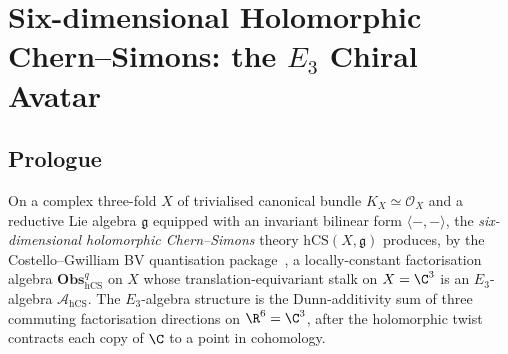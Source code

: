 
\providecommand{\SCchtop}{\mathsf{SC}^{\mathrm{ch},\mathrm{top}}}
\providecommand{\hCS}{\mathrm{hCS}}
\providecommand{\Obs}{\mathsf{Obs}}
\providecommand{\cA}{\mathcal{A}}
\providecommand{\cE}{\mathcal{E}}
\providecommand{\cF}{\mathcal{F}}
\providecommand{\cL}{\mathcal{L}}
\providecommand{\cO}{\mathcal{O}}
\providecommand{\fg}{\mathfrak{g}}
\providecommand{\ff}{\mathfrak{f}}
\providecommand{\fh}{\mathfrak{h}}
\providecommand{\fL}{\mathfrak{L}}
\providecommand{\dbar}{\bar\partial}
\providecommand{\CE}{\mathrm{CE}}
\providecommand{\MC}{\mathrm{MC}}
\providecommand{\QME}{\mathrm{QME}}
\providecommand{\Sym}{\mathrm{Sym}}
\providecommand{\id}{\mathrm{id}}
\providecommand{\Ran}{\mathrm{Ran}}
\providecommand{\Tr}{\mathrm{Tr}}
\providecommand{\Fact}{\mathrm{Fact}}
\providecommand{\Ch}{\mathrm{Ch}}
\providecommand{\End}{\mathrm{End}}
\providecommand{\Conf}{\mathrm{Conf}}
\providecommand{\Lie}{\mathsf{Lie}}
\providecommand{\Ass}{\mathsf{Ass}}
\providecommand{\HolFA}{\mathrm{HolFA}}
\providecommand{\EdHolFA}{E_d\text{-}\HolFA}
\providecommand{\EnHolFA}{E_n\text{-}\HolFA}
\providecommand{\Ainf}{A_\infty}
\providecommand{\Linf}{L_\infty}
\providecommand{\KT}{\mathrm{KT}}
\providecommand{\BV}{\mathrm{BV}}
\providecommand{\BRST}{\mathrm{BRST}}
\providecommand{\Fobs}{\mathbf{Obs}}
\providecommand{\Omegabar}{\Omega^{0,\bullet}}

\chapter{Six-dimensional Holomorphic Chern--Simons: the $E_3$ Chiral Avatar}
\label{ch:six-d-hcs-e3-chiral-avatar-platonic}

\section*{Prologue}

On a complex three-fold $X$ of trivialised canonical bundle
$K_X\simeq\cO_X$ and a reductive Lie algebra $\fg$ equipped with an
invariant bilinear form $\langle-,-\rangle$, the \emph{six-dimensional
holomorphic Chern--Simons} theory $\hCS(X,\fg)$ produces, by the
Costello--Gwilliam BV quantisation
package~\cite{CostelloRenormalization,CostelloGwilliam2017,CostelloGwilliam2021},
a locally-constant factorisation algebra $\Fobs^{q}_{\hCS}$ on $X$
whose translation-equivariant stalk on $X = \C^3$ is an
$E_3$-algebra
$\cA_{\hCS}$. The $E_3$-algebra structure is the
Dunn-additivity sum of three commuting factorisation directions on
$\R^6 = \C^3$, after the holomorphic twist contracts each copy of $\C$
to a point in cohomology.

